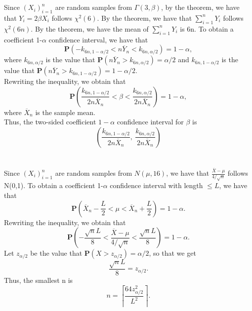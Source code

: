 \documentclass[10.5pt]{article}
\begin{document}
\section{}
Since $(X_i)_{i=1}^n$ are random samples from $\Gamma(3,\beta)$, by the theorem, we have that $Y_i=2\beta X_i$ follows $\chi^2(6)$. By the theorem, we have that $\sum_{i=1}^nY_i$ follows $\chi^2(6n)$. By the theorem, we have the mean of $\sum_{i=1}^nY_i$ is 6n. To obtain a coefficient 1-$\alpha$ confidence interval, we have that $$\mathbf{P}(-k_{6n,1-\alpha/2}<n\overline{Y}_n<k_{6n,\alpha/2})=1-\alpha,$$\indent
where $k_{6n,\alpha/2}$ is the value that $\mathbf{P}(n\overline{Y}_n>k_{6n,\alpha/2})=\alpha/2$ and $k_{6n,1-\alpha/2}$ is the value that $\mathbf{P}(n\overline{Y}_n>k_{6n,1-\alpha/2})=1-\alpha/2$.\\\indent
Rewriting the inequality, we obtain that $$\mathbf{P}\left(\frac{k_{6n,1-\alpha/2}}{2n\overline{X}_n}<\beta<\frac{k_{6n,\alpha/2}}{2n\overline{X}_n}\right)=1-\alpha,$$\indent
where $\overline{X}_n$ is the sample mean.\\\indent
Thus, the two-sided coefficient $1-\alpha$ confidence interval for $\beta$ is $$\left(\frac{k_{6n,1-\alpha/2}}{2n\overline{X}_n},~\frac{k_{6n,\alpha/2}}{2n\overline{X}_n}\right)$$

\section{}
Since $(X_i)_{i=1}^n$ are random samples from $N(\mu,16)$, we have that $\frac{\overline{X}-\mu}{4/\sqrt{n}}$ follows N(0,1). To obtain a coefficient 1-$\alpha$ confidence interval with length $\leqslant L$, we have that $$\mathbf{P}\left(\overline{X}_n-\frac{L}{2}<\mu<\overline{X}_n+\frac{L}{2}\right)=1-\alpha.$$\indent
Rewriting the inequality, we obtain that $$\mathbf{P}\left(-\frac{\sqrt{n}L}{8}<\frac{\overline{X}-\mu}{4/\sqrt{n}}<\frac{\sqrt{n}L}{8}\right)=1-\alpha.$$\indent
Let $z_{\alpha/2}$ be the value that $\mathbf{P}(X>z_{\alpha/2})=\alpha/2$, so that we get $$\frac{\sqrt{n}L}{8}=z_{\alpha/2}.$$\indent
Thus, the smallest n is $$n=\left\lceil \frac{64z_{\alpha/2}^2}{L^2}\right\rceil.$$
\end{document}
